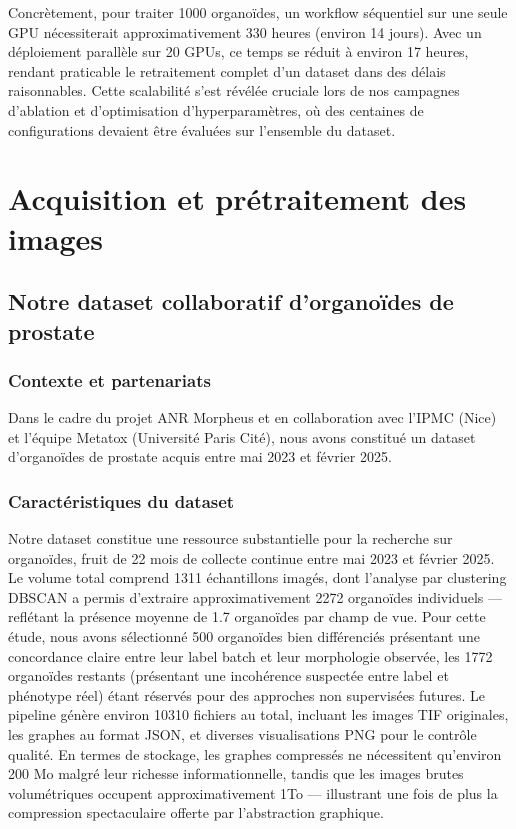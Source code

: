 Concrètement, pour traiter 1000 organoïdes, un workflow séquentiel sur une seule GPU nécessiterait approximativement 330 heures (environ 14 jours). Avec un déploiement parallèle sur 20 GPUs, ce temps se réduit à environ 17 heures, rendant praticable le retraitement complet d'un dataset dans des délais raisonnables. Cette scalabilité s'est révélée cruciale lors de nos campagnes d'ablation et d'optimisation d'hyperparamètres, où des centaines de configurations devaient être évaluées sur l'ensemble du dataset.

\section{Acquisition et prétraitement des images}

\subsection{Notre dataset collaboratif d'organoïdes de prostate}

\subsubsection{Contexte et partenariats}

Dans le cadre du projet ANR Morpheus et en collaboration avec l'IPMC (Nice) et l'équipe Metatox (Université Paris Cité), nous avons constitué un dataset d'organoïdes de prostate acquis entre mai 2023 et février 2025.

\subsubsection{Caractéristiques du dataset}

Notre dataset constitue une ressource substantielle pour la recherche sur organoïdes, fruit de 22 mois de collecte continue entre mai 2023 et février 2025. Le volume total comprend 1311 échantillons imagés, dont l'analyse par clustering DBSCAN a permis d'extraire approximativement 2272 organoïdes individuels — reflétant la présence moyenne de 1.7 organoïdes par champ de vue. Pour cette étude, nous avons sélectionné 500 organoïdes bien différenciés présentant une concordance claire entre leur label batch et leur morphologie observée, les 1772 organoïdes restants (présentant une incohérence suspectée entre label et phénotype réel) étant réservés pour des approches non supervisées futures. Le pipeline génère environ 10310 fichiers au total, incluant les images TIF originales, les graphes au format JSON, et diverses visualisations PNG pour le contrôle qualité. En termes de stockage, les graphes compressés ne nécessitent qu'environ 200 Mo malgré leur richesse informationnelle, tandis que les images brutes volumétriques occupent approximativement 1To — illustrant une fois de plus la compression spectaculaire offerte par l'abstraction graphique.

